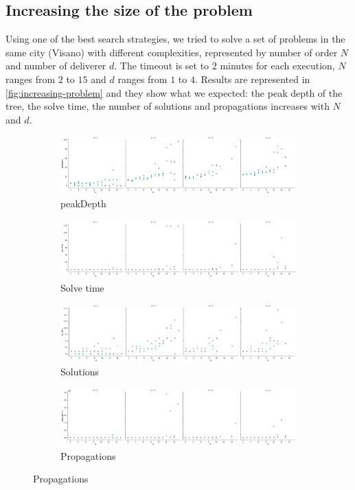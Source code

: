 \documentclass[10pt]{article}
\begin{document}
	\subsection{Increasing the size of the problem}
	\label{subsec:test-size-of-problem}
	Using one of the best search strategies, we tried to solve a set of problems in the same city (Visano)
	with different complexities, represented by number of order $N$ and number of deliverer $d$. 
	The timeout is set to 2 minutes for each execution, $N$ ranges from $2$ to $15$ and $d$ ranges from $1$ to $4$. 
	Results are represented in \cref{fig:increasing-problem} and they show what we expected: the peak depth of
	the tree, the solve time, the number of solutions and propagations increases with $N$ and $d$. 
	
	\begin{figure}
		\begin{subfigure}[c]{\textwidth}
			\includegraphics[width=\textwidth]{incr-problem-depth.png}
			\caption{peakDepth}
		\end{subfigure}
		\begin{subfigure}[b]{\textwidth}
			\includegraphics[width=\textwidth]{incr-problem-time.png}
			\caption{Solve time}
		\end{subfigure}
		\begin{subfigure}[b]{\textwidth}
			\includegraphics[width=\textwidth]{incr-problem-solutions.png}
			\caption{Solutions}
		\end{subfigure}
		\begin{subfigure}[b]{\textwidth}
			\includegraphics[width=\textwidth]{incr-problem-propagations.png}
			\caption{Propagations}
		\end{subfigure}


\end{figure}
\end{document}
